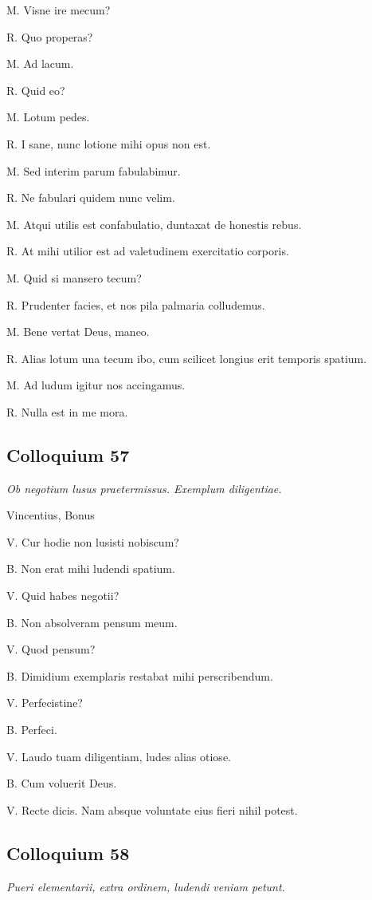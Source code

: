 \documentclass{article}
\begin{document}
M. Visne ire mecum?

R. Quo properas?

M. Ad lacum.

R. Quid eo?

M. Lotum pedes.

R. I sane, nunc lotione mihi opus non est.

M. Sed interim parum fabulabimur.

R. Ne fabulari quidem nunc velim.

M. Atqui utilis est confabulatio, duntaxat de honestis rebus.

R. At mihi utilior est ad valetudinem exercitatio corporis.

M. Quid si mansero tecum?

R. Prudenter facies, et nos pila palmaria colludemus.

M. Bene vertat Deus, maneo.

R. Alias lotum una tecum ibo, cum scilicet longius erit temporis spatium.

M. Ad ludum igitur nos accingamus.

R. Nulla est in me mora.

\subsection{Colloquium 57}
\emph{Ob negotium lusus praetermissus. Exemplum diligentiae.}

Vincentius, Bonus

V. Cur hodie non lusisti nobiscum?

B. Non erat mihi ludendi spatium.

V. Quid habes negotii?

B. Non absolveram pensum meum.

V. Quod pensum?

B. Dimidium exemplaris restabat mihi perscribendum.

V. Perfecistine?

B. Perfeci.

V. Laudo tuam diligentiam, ludes alias otiose.

B. Cum voluerit Deus.

V. Recte dicis. Nam absque voluntate eius fieri nihil potest.

\subsection{Colloquium 58}
\emph{Pueri elementarii, extra ordinem, ludendi veniam petunt.}
\end{document}

